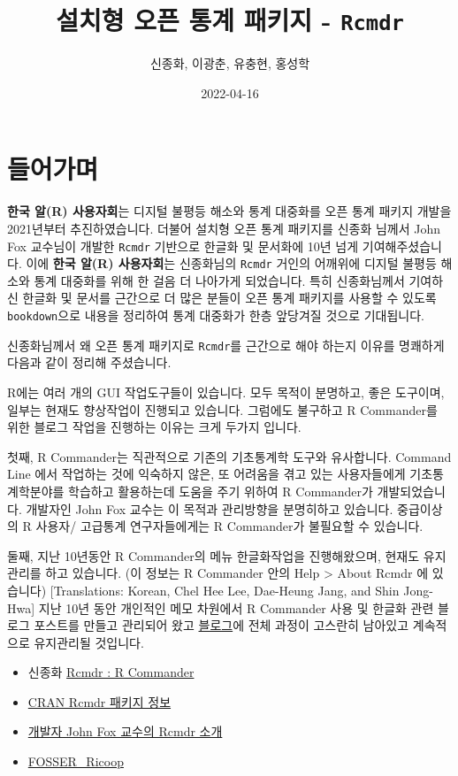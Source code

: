 \documentclass[
]{book}
\title{설치형 오픈 통계 패키지 - \texttt{Rcmdr}}
\author{신종화, 이광춘, 유충현, 홍성학}
\date{2022-04-16}
\providecommand{\tightlist}{%
  \setlength{\itemsep}{0pt}\setlength{\parskip}{0pt}}
\begin{document}
\maketitle

{
\setcounter{tocdepth}{1}
\tableofcontents
}
\hypertarget{uxb4e4uxc5b4uxac00uxba70}{%
\chapter{들어가며}\label{uxb4e4uxc5b4uxac00uxba70}}

\textbf{한국 알(R) 사용자회}는 디지털 불평등 해소와 통계 대중화를 오픈 통계 패키지 개발을 2021년부터 추진하였습니다.
더불어 설치형 오픈 통계 패키지를 신종화 님께서 John Fox 교수님이 개발한 \texttt{Rcmdr} 기반으로 한글화 및 문서화에 10년 넘게 기여해주셨습니다. 이에 \textbf{한국 알(R) 사용자회}는 신종화님의 \texttt{Rcmdr} 거인의 어깨위에 디지털 불평등 해소와 통계 대중화를 위해 한 걸음 더 나아가게 되었습니다. 특히 신종화님께서 기여하신 한글화 및 문서를 근간으로 더 많은 분들이 오픈 통계 패키지를 사용할 수 있도록 \texttt{bookdown}으로 내용을 정리하여 통계 대중화가 한층 앞당겨질 것으로 기대됩니다.

신종화님께서 왜 오픈 통계 패키지로 \texttt{Rcmdr}를 근간으로 해야 하는지 이유를 명쾌하게 다음과 같이 정리해 주셨습니다.

R에는 여러 개의 GUI 작업도구들이 있습니다. 모두 목적이 분명하고, 좋은 도구이며, 일부는 현재도 향상작업이 진행되고 있습니다. 그럼에도 불구하고 R Commander를 위한 블로그 작업을 진행하는 이유는 크게 두가지 입니다.

첫째, R Commander는 직관적으로 기존의 기초통계학 도구와 유사합니다. Command Line 에서 작업하는 것에 익숙하지 않은, 또 어려움을 겪고 있는 사용자들에게 기초통계학분야를 학습하고 활용하는데 도움을 주기 위하여 R Commander가 개발되었습니다. 개발자인 John Fox 교수는 이 목적과 관리방향을 분명히하고 있습니다. 중급이상의 R 사용자/ 고급통계 연구자들에게는 R Commander가 불필요할 수 있습니다.

둘째, 지난 10년동안 R Commander의 메뉴 한글화작업을 진행해왔으며, 현재도 유지관리를 하고 있습니다. (이 정보는 R Commander 안의 Help \textgreater{} About Rcmdr 에 있습니다) {[}Translations: Korean, Chel Hee Lee, Dae-Heung Jang, and Shin Jong-Hwa{]} 지난 10년 동안 개인적인 메모 차원에서 R Commander 사용 및 한글화 관련 블로그 포스트를 만들고 관리되어 왔고 \href{http://modernity.tistory.com}{블로그}에 전체 과정이 고스란히 남아있고 계속적으로 유지관리될 것입니다.

\begin{itemize}
\tightlist
\item
  신종화 \href{https://rcmdr.kr/}{Rcmdr : R Commander}
\item
  \href{https://cran.r-project.org/web/packages/Rcmdr/index.html}{CRAN Rcmdr 패키지 정보}
\item
  \href{https://socialsciences.mcmaster.ca/jfox/Misc/Rcmdr/}{개발자 John Fox 교수의 Rcmdr 소개}
\item
  \href{https://modernity.tistory.com/}{FOSSER\_Ricoop}
\end{itemize}
\end{document}
